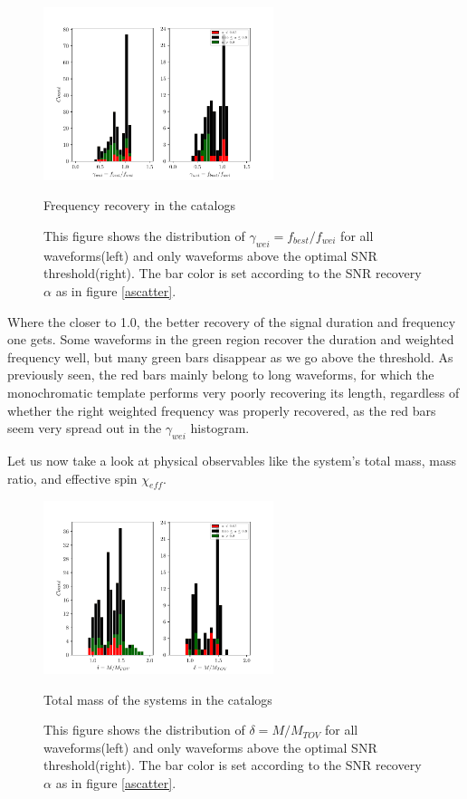 \begin{figure}[hbt!]
\begin{center}
\includegraphics[width=0.6\textwidth, angle=0]{images/Data_analysis/results/alpha_gammahist.pdf}
\captionsetup{width=0.8\textwidth}
\caption{Frequency recovery in the catalogs}
\caption*{This figure shows the distribution of $\gamma_{wei}=f_{best}/f_{wei}$ for all waveforms(left) and only waveforms above the optimal SNR threshold(right). The bar color is set according to the SNR recovery $\alpha$ as in figure \ref{ascatter}.}
\label{aghist}
\end{center}
\end{figure}
\FloatBarrier

Where the closer to 1.0, the better recovery of the signal duration and frequency one gets. Some waveforms in the green region recover the duration and weighted frequency well, but many green bars disappear as we go above the threshold. As previously seen, the red bars mainly belong to long waveforms, for which the monochromatic template performs very poorly recovering its length, regardless of whether the right weighted frequency was properly recovered, as the red bars seem very spread out in the $\gamma_{wei}$ histogram. 

\newpage

Let us now take a look at physical observables like the system's total mass, mass ratio, and effective spin $\chi_{eff}$.  

\begin{figure}[hbt!]
\begin{center}
\includegraphics[width=0.6\textwidth, angle=0]{images/Data_analysis/results/alpha_deltahist.pdf}
\captionsetup{width=0.8\textwidth}
\caption{Total mass of the systems in the catalogs}
\caption*{This figure shows the distribution of $\delta=M/M_{TOV}$ for all waveforms(left) and only waveforms above the optimal SNR threshold(right). The bar color is set according to the SNR recovery $\alpha$ as in figure \ref{ascatter}.}
\label{adelhist}
\end{center}
\end{figure}


